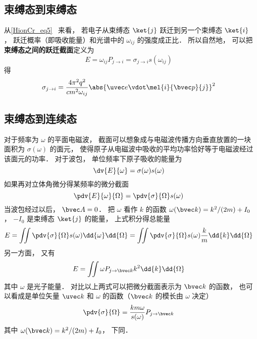 
\begin{issues}
\issueDraft
\end{issues}


\subsection{束缚态到束缚态}
从\autoref{HionCr_eq5}~ 来看， 若电子从束缚态 $\ket{j}$ 跃迁到另一个束缚态 $\ket{i}$， 跃迁概率（即吸收能量）和光谱中的 $\omega_{ij}$ 的强度成正比． 所以自然地， 可以把\textbf{束缚态之间的跃迁截面}定义为
\begin{equation}
E = \omega_{ij}P_{j\to i} = \sigma_{j\to i} s(\omega_{ij})
\end{equation}
得 %
\begin{equation}
\sigma_{j\to i} = \frac{4\pi^2 q^2}{c m^2 \omega_{ij}} \abs{\uvec e \vdot\mel{i}{\bvec p}{j}}^2
\end{equation}

\subsection{束缚态到连续态}
对于频率为 $\omega$ 的平面电磁波， 截面可以想象成与电磁波传播方向垂直放置的一块面积为 $\sigma(\omega)$ 的面元， 使得原子从电磁波中吸收的平均功率恰好等于电磁波经过该面元的功率． 对于波包， 单位频率下原子吸收的能量为
\begin{equation}
\dv{E}{\omega} = \sigma(\omega) s(\omega)
\end{equation}
如果再对立体角微分得某频率的微分截面 %
\begin{equation}
\pdv{E}{\omega}{\Omega} = \pdv{\sigma}{\Omega} s(\omega)
\end{equation}
当波包经过以后， $\bvec A = 0$． 把 $\omega$ 看作 $k$ 的函数 $\omega(\bvec k) = k^2/(2m) + I_0$， $-I_0$ 是束缚态 $\ket{j}$ 的能量， 上式积分得总能量
\begin{equation}
E = \iint \pdv{\sigma}{\Omega} s(\omega) \dd{\omega}\dd{\Omega} = \iint \pdv{\sigma}{\Omega} s(\omega) \frac{k}{m}\dd{k}\dd{\Omega}
\end{equation}
另一方面， 又有
\begin{equation}
E = \iint \omega P_{j\to {\bvec k}} k^2 \dd{k}\dd{\Omega}
\end{equation}
其中 $\omega$ 是光子能量． 对比以上两式可以把微分截面表示为 $\bvec k$ 的函数， 也可以看成是单位矢量 $\uvec k$ 和 $\omega$ 的函数（$\bvec k$ 的模长由 $\omega$ 决定）
\begin{equation}
\pdv{\sigma}{\Omega} = \frac{km \omega}{s(\omega)} P_{j\to \bvec k}
\end{equation}
其中 $\omega(\bvec k) = k^2/(2m) + I_0$， 下同．

